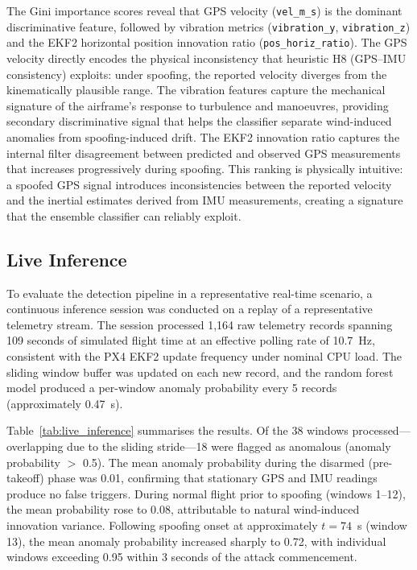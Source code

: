 \documentclass[electronics,article,accept,moreauthors]{Definitions/mdpi}
\begin{document}
The Gini importance scores reveal that GPS velocity (\texttt{vel\_m\_s}) is the dominant discriminative feature, followed by vibration metrics (\texttt{vibration\_y}, \texttt{vibration\_z}) and the EKF2 horizontal position innovation ratio (\texttt{pos\_horiz\_ratio}). The GPS velocity directly encodes the physical inconsistency that heuristic H8 (GPS--IMU consistency) exploits: under spoofing, the reported velocity diverges from the kinematically plausible range. The vibration features capture the mechanical signature of the airframe's response to turbulence and manoeuvres, providing secondary discriminative signal that helps the classifier separate wind-induced anomalies from spoofing-induced drift. The EKF2 innovation ratio captures the internal filter disagreement between predicted and observed GPS measurements that increases progressively during spoofing. This ranking is physically intuitive: a spoofed GPS signal introduces inconsistencies between the reported velocity and the inertial estimates derived from IMU measurements, creating a signature that the ensemble classifier can reliably exploit.

\subsection{Live Inference}

To evaluate the detection pipeline in a representative real-time scenario, a continuous inference session was conducted on a replay of a representative telemetry stream. The session processed 1,164 raw telemetry records spanning 109 seconds of simulated flight time at an effective polling rate of 10.7~Hz, consistent with the PX4 EKF2 update frequency under nominal CPU load. The sliding window buffer was updated on each new record, and the random forest model produced a per-window anomaly probability every 5 records (approximately 0.47~s).

Table~\ref{tab:live_inference} summarises the results. Of the 38 windows processed---overlapping due to the sliding stride---18 were flagged as anomalous (anomaly probability $>$ 0.5). The mean anomaly probability during the disarmed (pre-takeoff) phase was 0.01, confirming that stationary GPS and IMU readings produce no false triggers. During normal flight prior to spoofing (windows 1--12), the mean probability rose to 0.08, attributable to natural wind-induced innovation variance. Following spoofing onset at approximately $t=74$~s (window 13), the mean anomaly probability increased sharply to 0.72, with individual windows exceeding 0.95 within 3 seconds of the attack commencement.
\end{document}
